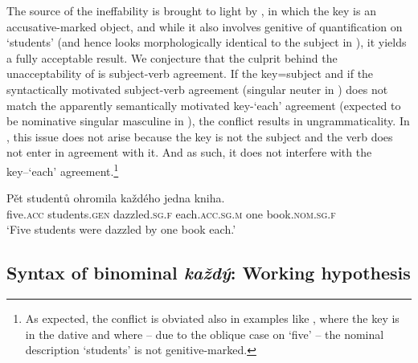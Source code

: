 \documentclass[output=paper,colorlinks,citecolor=brown,newtxmath]{langscibook}
\begin{document}
\noindent The source of the ineffability is brought to light by , in which the key is an accusative-marked object, and while it also involves genitive of quantification on `students' (and hence looks morphologically identical to the subject in ), it yields a fully acceptable result. We conjecture that the culprit behind the unacceptability of  is subject-verb agreement. If the key=subject and if the syntactically motivated subject-verb agreement (singular neuter in ) does not match the apparently semantically motivated key-`each' agreement (expected to be nominative singular masculine in ), the conflict results in ungrammaticality. In , this issue does not arise because the key is not the subject and the verb does not enter in agreement with it. And as such, it does not interfere with the key--`each' agreement.\footnote{As expected, the conflict is obviated also in examples like , where the key is in the dative and where -- due to the oblique case on `five' -- the nominal description `students' is not genitive-marked.

\z
}

\ea\label{ex:goq-acc}\gll Pět studentů ohromila každého jedna kniha.\\
five.\textsc{acc} students.\textsc{gen} dazzled.\textsc{sg.f} each.\textsc{acc.sg.m} one book.\textsc{nom.sg.f}\\
\glt `Five students were dazzled by one book each.'
\z

\subsection{Syntax of binominal \textit{každý}: Working hypothesis}\label{s2.3}
\end{document}
